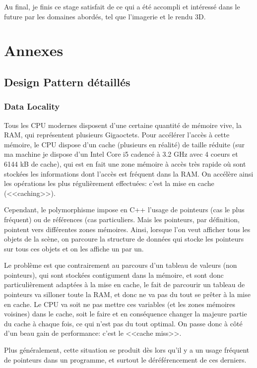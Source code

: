 \documentclass[a4paper,french,12pt]{article}
\begin{document}
	Au final, je finis ce stage satisfait de ce qui a été accompli et intéressé dans le future par les domaines abordés,
	tel que l'imagerie et le rendu 3D.
	\newpage
\section{Annexes}

	\subsection{Design Pattern détaillés}
	  \subsubsection{Data Locality}
	  \label{data_locality}
	      Tous les CPU modernes disposent d'une certaine quantité de mémoire vive, la RAM, qui représentent
	      plusieurs Gigaoctets. Pour accélérer l'accès à cette mémoire, le CPU dispose d'un cache (plusieurs en réalité)
	      de taille réduite (sur ma machine je dispose d'un Intel Core i5 cadencé à 3.2 GHz avec 4 coeurs et 6144 kB
	      de cache), qui est en fait une zone mémoire à accès très rapide où sont stockées les informations dont l'accès est fréquent
	      dans la RAM. On accélère ainsi les opérations les plus régulièrement effectuées: c'est la mise en cache (<<caching>>).

	      Cependant, le polymorphisme impose en C++ l'usage de pointeurs (cas le plus fréquent) ou de références (cas particuliers.
	      Mais les pointeurs, par définition, pointent vers différentes zones mémoires.
	      Ainsi, lorsque l'on veut afficher tous les objets de la scène, on parcoure la structure de données qui
	      stocke les pointeurs sur tous ces objets et on les affiche un par un.

	      Le problème est que contrairement au parcours d'un tableau de valeurs (non pointeurs), qui sont stockées
	      contigument dans la mémoire, et sont donc particulièrement adaptées à la mise en cache, le fait de
	      parcourir un tableau de pointeurs va silloner toute la RAM, et donc ne va pas du tout se prêter à la mise
	      en cache. Le CPU va soit ne pas mettre ces variables (et les zones mémoires voisines) dans le cache, soit le faire
	      et en conséquence changer la majeure partie du cache à chaque fois, ce qui n'est pas du tout optimal.
	      On passe donc à côté d'un beau gain de performance: c'est le <<cache miss>>.

	      Plus généralement, cette situation se produit dès lors qu'il y a un usage fréquent de pointeurs dans un
	      programme, et surtout le déréférencement de ces derniers.
\end{document}
